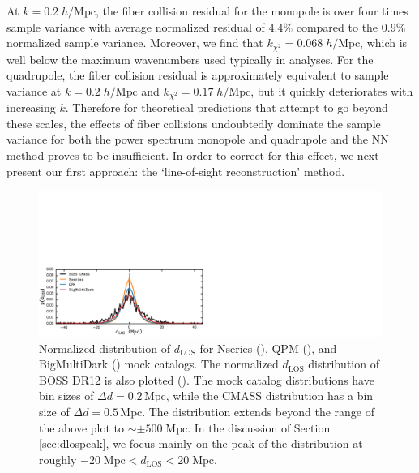 At $k = 0.2\;h/\mathrm{Mpc}$, the fiber collision residual for 
the monopole is over four times sample variance with average normalized 
residual of $4.4\%$ compared to the $0.9\%$ normalized sample variance. 
Moreover, we find that $k_{\chi^2} = 0.068\;h/\mathrm{Mpc}$, which is well below the maximum wavenumbers used typically in analyses. 
For the quadrupole, the fiber collision residual is approximately equivalent to 
sample variance at $k = 0.2\;h/\mathrm{Mpc}$ and $k_{\chi^2} = 0.17\;h/\mathrm{Mpc}$, but it quickly deteriorates with increasing $k$. 
Therefore for theoretical predictions that attempt to go beyond these scales, the effects of 
fiber collisions undoubtedly dominate the sample variance for both the power 
spectrum monopole and quadrupole and the NN method proves to be insufficient. In order to 
correct for this effect,  we next present our first approach: the `line-of-sight 
reconstruction' method.
\begin{figure}
\begin{center}
\includegraphics[width=1.\textwidth]{figs/fc/mock_catalog_dlos.pdf}
\caption{
Normalized distribution of $d_{\mathrm{LOS}}$ for Nseries
(\nseriescolor), QPM (\qpmcolor), and BigMultiDark (\tmcolor) 
mock catalogs. The normalized $d_{\mathrm{LOS}}$ distribution of 
BOSS DR12 is also plotted (\cmasscolor). The mock catalog distributions 
have bin sizes of $\Delta d = 0.2\, \mathrm{Mpc}$, while the CMASS distribution has
a bin size of $\Delta d = 0.5\, \mathrm{Mpc}$. The distribution extends beyond 
the range of the above plot to $\sim \pm 500 \; \mathrm{Mpc}$. 
In the discussion of Section \ref{sec:dlospeak}, we focus mainly 
on the peak of the distribution at roughly
$-20 \; \mathrm{Mpc} < d_\mathrm{LOS} < 20 \;\mathrm{Mpc}$.} 
\label{fig:d_los}
\end{center}
\end{figure}
